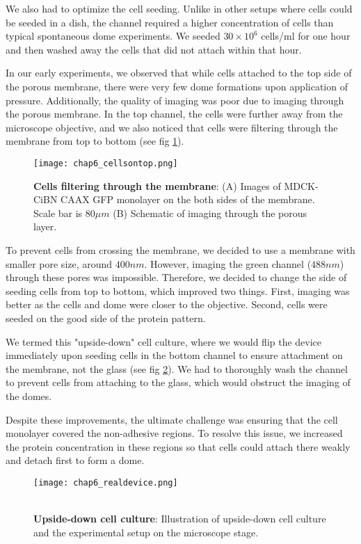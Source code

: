 We also had to optimize the cell seeding. Unlike in other setups where cells could be seeded in a dish, the channel required a higher concentration of cells than typical spontaneous dome experiments. We seeded $30\times 10^6$ cells/ml for one hour and then washed away the cells that did not attach within that hour.  

In our early experiments, we observed that while cells attached to the top side of the porous membrane, there were very few dome formations upon application of pressure. Additionally, the quality of imaging was poor due to imaging through the porous membrane. In the top channel, the cells were further away from the microscope objective, and we also noticed that cells were filtering through the membrane from top to bottom (see fig \ref{fig_6_4}).  

\begin{figure}[h]
	\centering
	\texttt{[image: chap6\_cellsontop.png]}
	\caption{ \textbf{Cells filtering through the membrane}: (A) Images of MDCK-CiBN CAAX GFP monolayer on the both sides of the membrane. Scale bar is $80\mu m$ (B) Schematic of imaging through the porous layer.
	}\label{fig_6_4}
\end{figure}

To prevent cells from crossing the membrane, we decided to use a membrane with smaller pore size, around $400nm$. However, imaging the green channel ($488nm$) through these pores was impossible. Therefore, we decided to change the side of seeding cells from top to bottom, which improved two things. First, imaging was better as the cells and dome were closer to the objective. Second, cells were seeded on the good side of the protein pattern.  

We termed this "upside-down" cell culture, where we would flip the device immediately upon seeding cells in the bottom channel to ensure attachment on the membrane, not the glass (see fig \ref{fig_6_5}). We had to thoroughly wash the channel to prevent cells from attaching to the glass, which would obstruct the imaging of the domes.  

Despite these improvements, the ultimate challenge was ensuring that the cell monolayer covered the non-adhesive regions. To resolve this issue, we increased the protein concentration in these regions so that cells could attach there weakly and detach first to form a dome.  


\begin{figure}[h]
	\begin{minipage}[c]{0.7\textwidth}
		\texttt{[image: chap6\_realdevice.png]}
	\end{minipage}\hfill
	\begin{minipage}[c]{0.27\textwidth}
		\caption{\\ \textbf{Upside-down cell culture}: Illustration of upside-down cell culture and the experimental setup on the microscope stage.
		}\label{fig_6_5}
	\end{minipage}
\end{figure}

